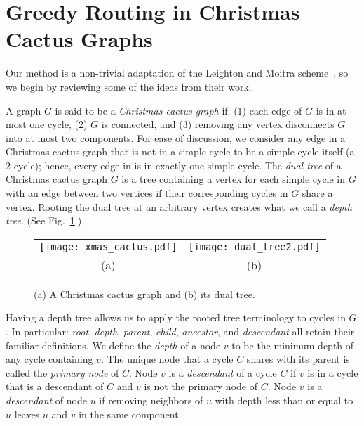 \documentclass[11pt]{article}
\begin{document}
\section{Greedy Routing in Christmas Cactus Graphs}
\label{section:greedy-routing}
Our method is a non-trivial adaptation of
the Leighton and Moitra scheme~\cite{lm-srgem-08}, so we begin
by reviewing some of the ideas from their work.

A graph $G$ is said to be a \emph{Christmas cactus graph} if: (1) each
edge of $G$ is in at most one cycle, (2) $G$ is connected, and (3) removing 
any vertex disconnects $G$ into at most two components.
For ease of discussion, we consider any edge in a Christmas cactus graph that 
is not in a simple cycle to be a simple cycle itself (a 2-cycle); hence, 
every edge in is in exactly one simple cycle.
The \emph{dual tree} of a Christmas cactus graph $G$ is a tree 
containing a vertex for each simple cycle in $G$ with an edge 
between two vertices if their corresponding cycles in $G$ share a vertex. 
Rooting the dual tree at an arbitrary vertex creates what we call a \emph{depth tree}.\ifFull
(See Fig.~\ref{fig:cactus}.)

\begin{figure}[!hbt]
\begin{center}
\begin{tabular}{cc}
\texttt{[image: xmas\_cactus.pdf]} &
\texttt{[image: dual\_tree2.pdf]} \\
(a) & (b)
\end{tabular}
\end{center}
\caption{(a) A Christmas cactus graph and (b) its dual tree.}
\label{fig:cactus}
\end{figure}

\fi

Having a depth tree allows us to apply the rooted tree terminology to
cycles in $G$. In particular: \emph{root}, \emph{depth}, \emph{parent}, \emph{child}, 
\emph{ancestor}, and \emph{descendant} all retain their familiar definitions. 
We define the \emph{depth} of a node $v$ to be the minimum depth of any 
cycle containing $v$. The unique node that a cycle $C$ shares with its parent 
is called the \emph{primary node} of $C$. Node $v$ is a \emph{descendant} of 
a cycle $C$ if $v$ is in a cycle that is a descendant of $C$ and $v$ is not 
the primary node of $C$. Node $v$ is a \emph{descendant} of node $u$ if removing
neighbors of $u$ with depth less than or equal to $u$ leaves $u$ and $v$ in
the same component.
\end{document}
